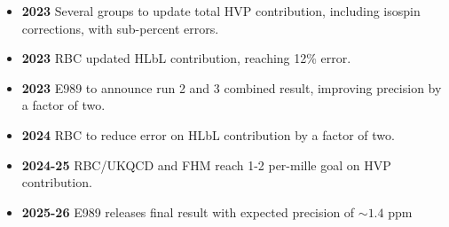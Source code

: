 \documentclass[12pt,hyperpdf]{article}
\begin{document}
\begin{itemize}
\begin{itemize}
    \item{\bf 2023} Several groups to update total HVP contribution, including isospin corrections, with sub-percent errors.
    \item{\bf 2023} RBC updated HLbL contribution, reaching 12\% error.
    \item{\bf 2023} E989 to announce run 2 and 3 combined result, improving precision by a factor of two.
    \item{\bf 2024} RBC to reduce error on HLbL contribution by a factor of two.
    \item{\bf 2024-25} RBC/UKQCD and FHM reach 1-2 per-mille goal on HVP contribution. 
    \item{\bf 2025-26} E989 releases final result with expected precision of $\sim 1.4$ ppm
\end{itemize}
\end{itemize}

\end{document}
